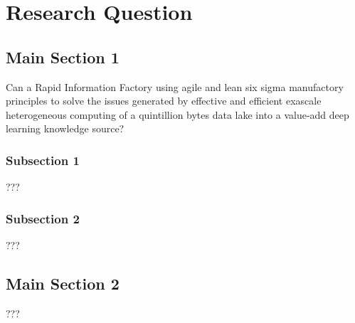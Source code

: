 
\chapter{Research Question} %

\label{Chapter02} %



\section{Main Section 1}

Can a Rapid Information Factory using agile and lean six sigma manufactory principles to solve the issues generated by effective and efficient exascale heterogeneous computing of a quintillion bytes data lake into a value-add deep learning knowledge source?

\subsection{Subsection 1}

???


\subsection{Subsection 2}

???


\section{Main Section 2}

???
